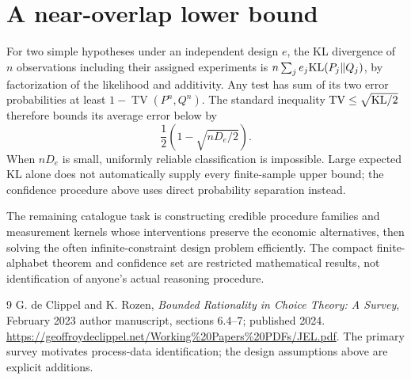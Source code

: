 \documentclass[11pt,a4paper]{article}
\begin{document}
\section{A near-overlap lower bound}
For two simple hypotheses under an independent design $e$, the KL divergence of $n$ observations including their assigned experiments is $n\sum_je_j{\rm KL}(P_j\Vert Q_j)$, by factorization of the likelihood and additivity. Any test has sum of its two error probabilities at least $1-\operatorname{TV}(P^n,Q^n)$. The standard inequality $\operatorname{TV}\le\sqrt{{\rm KL}/2}$ therefore bounds its average error below by
\[
 \frac12\left(1-\sqrt{nD_e/2}\right).
\]
When $nD_e$ is small, uniformly reliable classification is impossible. Large expected KL alone does not automatically supply every finite-sample upper bound; the confidence procedure above uses direct probability separation instead.

The remaining catalogue task is constructing credible procedure families and measurement kernels whose interventions preserve the economic alternatives, then solving the often infinite-constraint design problem efficiently. The compact finite-alphabet theorem and confidence set are restricted mathematical results, not identification of anyone's actual reasoning procedure.
\begin{thebibliography}{9}
 G. de Clippel and K. Rozen, \emph{Bounded Rationality in Choice Theory: A Survey}, February 2023 author manuscript, sections 6.4--7; published 2024.
\url{https://geoffroydeclippel.net/Working%20Papers%20PDFs/JEL.pdf}.
The primary survey motivates process-data identification; the design assumptions above are explicit additions.
\end{thebibliography}
\end{document}
